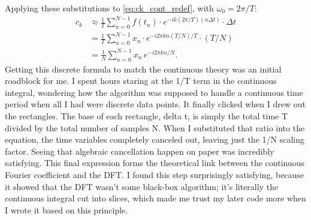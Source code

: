 \documentclass{article}
\begin{document}
Applying these substitutions to \eqref{eq:ck_cont_redef}, with $\omega_0=2\pi/T$:
\begin{align}
    c_k 
    &\approx \frac{1}{T}\sum_{n=0}^{N-1} f(t_n) \cdot e^{-i k (2\pi/T) (n\Delta t)} \cdot \Delta t \nonumber \\
    &= \frac{1}{T}\sum_{n=0}^{N-1} x_n \cdot e^{-i 2\pi k n (T/N) / T} \cdot (T/N) \nonumber \\
    &= \frac{1}{N}\sum_{n=0}^{N-1} x_n \, e^{-i 2\pi k n / N}.
    \label{eq:ck_discrete}
\end{align}
Getting this discrete formula to match the continuous theory was an initial roadblock for me. I spent hours staring at the 1/T term in the continuous integral, wondering how the algorithm was supposed to handle a continuous time period when all I had were discrete data points. It finally clicked when I drew out the rectangles. The base of each rectangle, delta t, is simply the total time T divided by the total number of samples N. When I substituted that ratio into the equation, the time variables completely canceled out, leaving just the 1/N scaling factor. Seeing that algebraic cancellation happen on paper was incredibly satisfying. This final expression forms the theoretical link between the continuous Fourier coefficient and the DFT. I found this step surprisingly satisfying, because it showed that the DFT wasn’t some black-box algorithm; it’s literally the continuous integral cut into slices, which made me trust my later code more when I wrote it based on this principle.
\end{document}

